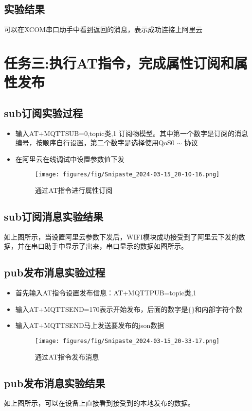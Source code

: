\documentclass[12pt,hyperref,a4paper,UTF8]{ctexart}
\begin{document}
\subsection{实验结果}
    可以在XCOM串口助手中看到返回的消息，表示成功连接上阿里云





\section{任务三:执行AT指令，完成属性订阅和属性发布}
\subsection{sub订阅实验过程}

\begin{itemize}[itemsep=-5pt, topsep=0pt, partopsep=0pt]
    \item 输入AT+MQTTSUB=0,topic类,1 订阅物模型。其中第一个数字是订阅的消息编号，按顺序自行设置，第二个数字是选择使用QoS0 $\sim$ 协议
    \item 在阿里云在线调试中设置参数值下发
    \begin{figure}[H]
        \centering
        \texttt{[image: figures/fig/Snipaste\_2024-03-15\_20-10-16.png]}
        \caption{通过AT指令进行属性订阅}
        \label{fig:enter-label}
    \end{figure}



\end{itemize}

\subsection{sub订阅消息实验结果}
如上图所示，当设置阿里云参数下发后，WIFI模块成功接受到了阿里云下发的数据，并在串口助手中显示了出来，串口显示的数据如图所示。


\subsection{pub发布消息实验过程}

\begin{itemize}
    \item 首先输入AT指令设置发布信息：AT+MQTTPUB=topic类,1
    \item 输入AT+MQTTSEND=170表示开始发布，后面的数字是$\{ \}$和内部字符个数
    \item 输入AT+MQTTSEND马上发送要发布的json数据
    \begin{figure}[H]
        \centering
        \texttt{[image: figures/fig/Snipaste\_2024-03-15\_20-33-17.png]}
        \caption{通过AT指令发布消息}
        \label{fig:enter-label}
    \end{figure}

\end{itemize}

\subsection{pub发布消息实验结果}
如上图所示，可以在设备上直接看到接受到的本地发布的数据。


\end{document}
